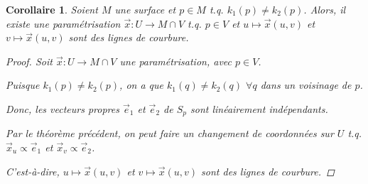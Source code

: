 \documentclass{report}
\newtheorem*{coro}{Corollaire}
\theoremstyle{definition}
\theoremstyle{remark}
\begin{document}
	\begin{coro}
		Soient $M$ une surface et $p\in M$ t.q. $k_1(p) \neq k_2(p)$. Alors, il existe une param\'etrisation $\vec x:U\to M\cap V$ t.q. $p\in V$ et $u\mapsto\vec x(u,v)$ et $v\mapsto\vec x(u,v)$ sont des lignes de courbure.
		\begin{proof}
			Soit $\vec x:U\to M\cap V$ une param\'etrisation, avec $p\in V$.

			Puisque $k_1(p) \neq k_2(p)$, on a que $k_1(q) \neq k_2(q)$ $\forall q$ dans un voisinage de $p$.

			Donc, les vecteurs propres $\vec e_1$ et $\vec e_2$ de $S_p$ sont lin\'eairement ind\'ependants.

			Par le th\'eor\`eme pr\'ec\'edent, on peut faire un changement de coordonn\'ees sur $U$ t.q. $\vec x_u\propto\vec e_1$ et $\vec x_v\propto\vec e_2$.

			C'est-\`a-dire, $u\mapsto\vec x(u,v)$ et $v\mapsto\vec x(u,v)$ sont des lignes de courbure.
		\end{proof}
	\end{coro}
\end{document}
